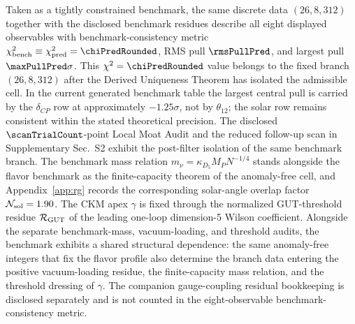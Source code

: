 \documentclass[11pt]{article}
\begin{document}
Taken as a tightly constrained benchmark, the same discrete data $(26,8,312)$
together with the disclosed benchmark residues describe all eight displayed
observables with benchmark-consistency metric
$\chi_{\rm bench}^2\equiv\chi_{\rm pred}^2=\chiPredRounded$, RMS pull
$\rmsPullPred$, and largest pull $\maxPullPred\sigma$. This
$\chi^2=\chiPredRounded$ value belongs to the fixed branch $(26,8,312)$ after
the Derived Uniqueness Theorem has isolated the admissible cell. In the
current generated benchmark table the largest central pull is carried by the
$\delta_{CP}$ row at approximately $-1.25\sigma$, not by $\theta_{12}$; the
solar row remains consistent within the stated theoretical precision. The
disclosed $\scanTrialCount$-point Local Moat Audit and the reduced follow-up
scan in Supplementary Sec.~S2 exhibit the post-filter isolation of the same
benchmark branch. The benchmark mass relation
$m_\nu=\kappa_{D_5}M_PN^{-1/4}$ stands alongside the flavor benchmark as the
finite-capacity theorem of the anomaly-free cell, and Appendix~\ref{app:rg}
records the corresponding solar-angle overlap factor $\mathcal N_{\rm sol}=1.90$.
The CKM apex $\gamma$ is fixed through the normalized GUT-threshold residue
$\mathcal R_{\rm GUT}$ of the leading one-loop dimension-5 Wilson
coefficient. Alongside the separate benchmark-mass, vacuum-loading, and
threshold audits, the benchmark exhibits a shared structural dependence: the
same anomaly-free integers that fix the flavor profile also determine the
branch data entering the positive vacuum-loading residue, the finite-capacity
mass relation, and the threshold dressing of $\gamma$. The companion
gauge-coupling residual bookkeeping is disclosed separately and is not counted
in the eight-observable benchmark-consistency metric.
\end{document}
